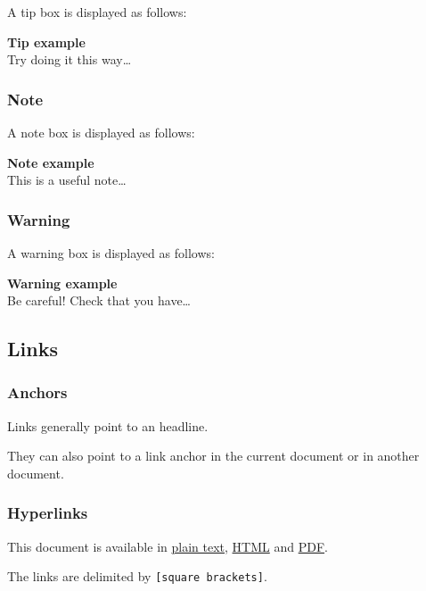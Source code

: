 \documentclass[11pt]{article}
\begin{document}
A tip box is displayed as follows:

\begin{tip}
\textbf{Tip example} \\[0pt]
Try doing it this way\ldots{}
\end{tip}

\subsubsection*{Note}
\label{sec:org2dd3f0a}

A note box is displayed as follows:

\begin{note}
\textbf{Note example} \\[0pt]
This is a useful note\ldots{}
\end{note}

\subsubsection*{Warning}
\label{sec:org2ff8458}

A warning box is displayed as follows:

\begin{warning}
\textbf{Warning example} \\[0pt]
Be careful!  Check that you have\ldots{}
\end{warning}

\subsection*{Links}
\label{sec:org3dabed7}
\subsubsection*{Anchors}
\label{sec:orgef6bed0}
Links generally point to an headline.

They can also point to a link anchor \label{orgc288a92} in the current
document or in another document.

\subsubsection*{Hyperlinks}
\label{sec:org6b5ec84}

This document is available in \href{example.txt}{plain text}, \href{example.html}{HTML} and \href{example.pdf}{PDF}.

The links are delimited by \texttt{[square brackets]}.
\end{document}
